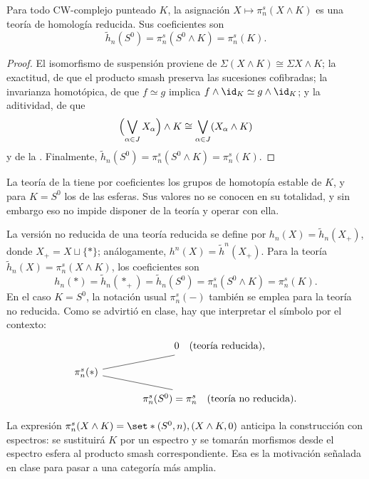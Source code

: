\begin{prop}\label{prop:smash}
Para todo CW-complejo punteado $K$, la asignación $X\mapsto\pi_n^s(X\wedge K)$ es una teoría de homología reducida. Sus coeficientes son
\[
\tilde h_n(S^0)=\pi_n^s(S^0\wedge K)=\pi_n^s(K).
\]
\end{prop}
\begin{proof}
El isomorfismo de suspensión proviene de $\Sigma(X\wedge K)\cong\Sigma X\wedge K$; la exactitud, de que el producto smash preserva las sucesiones cofibradas; la invarianza homotópica, de que $f\simeq g$ implica $f\wedge\id_K\simeq g\wedge\id_K$; y la aditividad, de que
\[
\Bigl(\bigvee_{\alpha\in J}X_\alpha\Bigr)\wedge K\cong\bigvee_{\alpha\in J}(X_\alpha\wedge K)
\]
y de la . Finalmente, $\tilde h_n(S^0)=\pi_n^s(S^0\wedge K)=\pi_n^s(K)$.
\end{proof}

\begin{nota}
   La teoría de la  tiene por coeficientes los grupos de homotopía estable de $K$, y para $K=S^0$ los de las esferas. Sus valores no se conocen en su totalidad, y sin embargo eso no impide disponer de la teoría y operar con ella.
\end{nota}

\begin{nota}
   La versión no reducida de una teoría reducida se define por $h_n(X)=\tilde h_n(X_+)$, donde $X_+=X\sqcup\{*\}$; análogamente, $h^n(X)=\tilde h^n(X_+)$. Para la teoría $\tilde h_n(X)=\pi_n^s(X\wedge K)$, los coeficientes son
\[
h_n(*)=\tilde h_n(*_+)=\tilde h_n(S^0)=\pi_n^s(S^0\wedge K)=\pi_n^s(K).
\]
   En el caso $K=S^0$, la notación usual $\pi_n^s(-)$ también se emplea para la teoría no reducida. Como se advirtió en clase, hay que interpretar el símbolo por el contexto:
\[
\begin{tikzcd}[column sep=large,row sep=small]
& 0 \quad\text{(teoría reducida)},\\
\pi_n^s(*) \arrow[ur,no head] \arrow[dr,no head] &\\
& \pi_n^s(S^0)=\pi_n^s \quad\text{(teoría no reducida)}.
\end{tikzcd}
\]
\end{nota}

\begin{nota}
   La expresión $\pi_n^s(X\wedge K)=\set*{(S^0,n),(X\wedge K,0)}$ anticipa la construcción con espectros: se sustituirá $K$ por un espectro y se tomarán morfismos desde el espectro esfera al producto smash correspondiente. Esa es la motivación señalada en clase para pasar a una categoría más amplia.
\end{nota}

